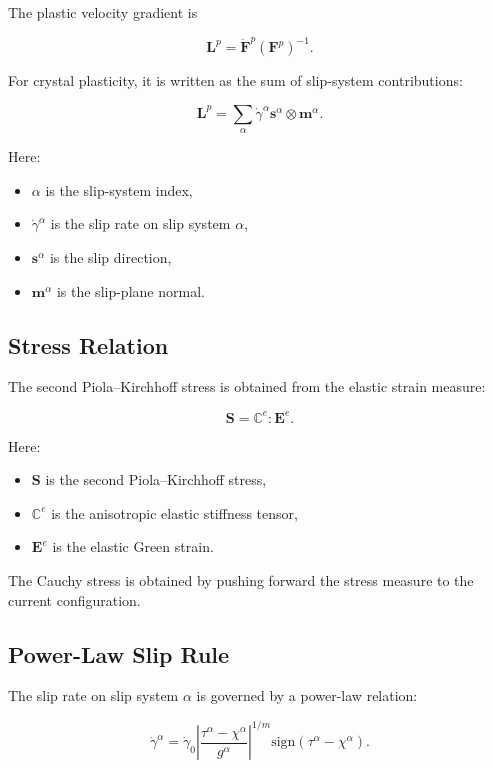 ﻿\documentclass[11pt,a4paper]{article}
\begin{document}
The plastic velocity gradient is

\[
\bm{L}^p
=
\dot{\bm{F}}^p
(\bm{F}^p)^{-1}.
\]

For crystal plasticity, it is written as the sum of slip-system contributions:

\[
\bm{L}^p
=
\sum_{\alpha}
\dot{\gamma}^{\alpha}
\bm{s}^{\alpha}
\otimes
\bm{m}^{\alpha}.
\]

Here:

\begin{itemize}[leftmargin=*]
    \item $\alpha$ is the slip-system index,
    \item $\dot{\gamma}^{\alpha}$ is the slip rate on slip system $\alpha$,
    \item $\bm{s}^{\alpha}$ is the slip direction,
    \item $\bm{m}^{\alpha}$ is the slip-plane normal.
\end{itemize}

\subsection{Stress Relation}

The second Piola--Kirchhoff stress is obtained from the elastic strain measure:

\[
\bm{S}
=
\mathbb{C}^e
:
\bm{E}^e.
\]

Here:

\begin{itemize}[leftmargin=*]
    \item $\bm{S}$ is the second Piola--Kirchhoff stress,
    \item $\mathbb{C}^e$ is the anisotropic elastic stiffness tensor,
    \item $\bm{E}^e$ is the elastic Green strain.
\end{itemize}

The Cauchy stress is obtained by pushing forward the stress measure to the current configuration.

\subsection{Power-Law Slip Rule}

The slip rate on slip system $\alpha$ is governed by a power-law relation:

\[
\dot{\gamma}^{\alpha}
=
\dot{\gamma}_0
\left|
\frac{
\tau^{\alpha}-\chi^{\alpha}
}{
g^{\alpha}
}
\right|^{1/m}
\mathrm{sign}
\left(
\tau^{\alpha}-\chi^{\alpha}
\right).
\]
\end{document}
